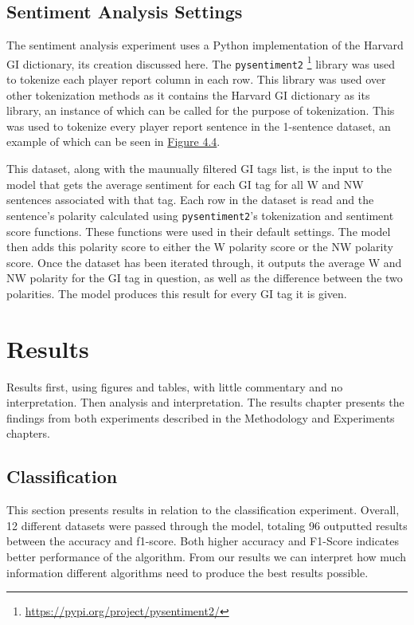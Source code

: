 \documentclass[oneside,12pt]{Classes/RoboticsLaTeX}
\begin{document}
\section{Sentiment Analysis Settings}
The sentiment analysis experiment uses a Python implementation of the Harvard GI dictionary, its creation discussed here. The \texttt{pysentiment2} \footnote{\url{https://pypi.org/project/pysentiment2/}} library was used to tokenize each player report column in each row. This library was used over other tokenization
methods as it contains the Harvard GI dictionary as its library, an instance of which can be called for the purpose of tokenization. This was used to tokenize every player report sentence in the 1-sentence dataset, an example of which can be seen in  \hyperref[fig:1-sentence_gi_tag_example]{Figure 4.4}. \par
This dataset, along with the maunually filtered GI tags list, is the input to the model that gets the average sentiment for each GI tag for all W and NW sentences associated with that tag. Each row in the dataset is read and the sentence's polarity calculated using \texttt{pysentiment2}'s tokenization and sentiment score
functions. These functions were used in their default settings. The model then adds this polarity score to either the W polarity score or the NW polarity score. Once the dataset has been iterated through, it outputs the average W and NW polarity for the GI tag in question, as well as the difference between the two polarities. 
The model produces this result for every GI tag it is given.

\chapter{Results}
\label{chap:results}
Results first, using figures and tables, with little commentary and no interpretation.
Then analysis and interpretation.
The results chapter presents the findings from both experiments described in the Methodology and Experiments chapters.
\section{Classification}
This section presents results in relation to the classification experiment. Overall, 12 different datasets were passed through the model, totaling 96 outputted results between the accuracy and f1-score. 
Both higher accuracy and F1-Score indicates better performance of the algorithm. From our results we can interpret how much information different algorithms need to produce the best results possible.\par
\end{document}
